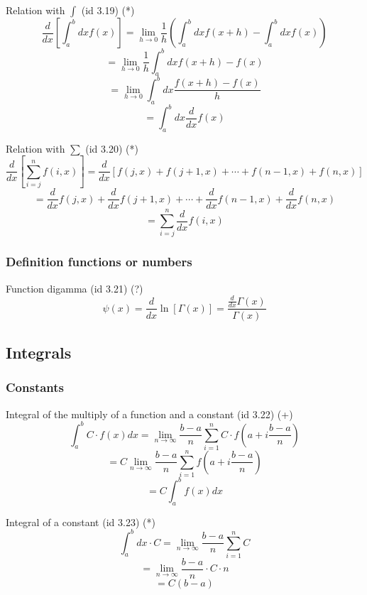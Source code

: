 \documentclass{book}
\begin{document}
                    Relation with $\int$ (id 3.19) (*)
                    \[\frac{d}{dx} \left[\int^b_a dx f(x) \right] = \lim_{h \rightarrow 0} \frac{1}{h} \left(\int^b_a dx f(x + h) - \int^b_a dx f(x) \right)\]
                    \[= \lim_{h \rightarrow 0} \frac{1}{h} \int^b_a dx f(x + h) - f(x)\]
                    \[= \lim_{h \rightarrow 0} \int^b_a dx \frac{f(x + h) - f(x)}{h}\]
                    \[= \int^b_a dx \frac{d}{dx} f(x)\]

                    Relation with $\sum$ (id 3.20) (*)
                    \[\frac{d}{dx} \left[\sum^n_{i=j} f(i, x) \right] = \frac{d}{dx} [f(j, x) + f(j + 1, x) + \cdots + f(n - 1, x) + f(n, x)]\]
                    \[= \frac{d}{dx} f(j, x) + \frac{d}{dx} f(j + 1, x) + \cdots + \frac{d}{dx} f(n - 1, x) + \frac{d}{dx} f(n, x)\]
                    \[= \sum^n_{i=j} \frac{d}{dx} f(i, x)\]
                
                \subsubsection{Definition functions or numbers}
                    Function digamma (id 3.21) (?)
                    \[\psi(x) = \frac{d}{dx} \ln[\Gamma(x)] = \frac{\frac{d}{dx} \Gamma(x)}{\Gamma(x)}\]

            \subsection{Integrals}
                \subsubsection{Constants}
                    Integral of the multiply of a function and a constant (id 3.22) (+)
                    \[\int^b_a C \cdot f(x) dx = \lim_{n \rightarrow \infty} \frac{b - a}{n} \sum^n_{i=1} C \cdot f\left(a + i \frac{b - a}{n}\right)\]
                    \[= C \lim_{n \rightarrow \infty} \frac{b - a}{n} \sum^n_{i=1} f \left(a + i\frac{b - a}{n}\right) \]
                    \[= C \int^b_a f(x) dx\]

                    Integral of a constant (id 3.23) (*)
                    \[\int^b_a dx \cdot C = \lim_{n \rightarrow \infty} \frac{b - a}{n} \sum^n_{i=1} C\]
                    \[= \lim_{n \rightarrow \infty} \frac{b - a}{n} \cdot C \cdot n\]
                    \[= C(b - a)\]
\end{document}
